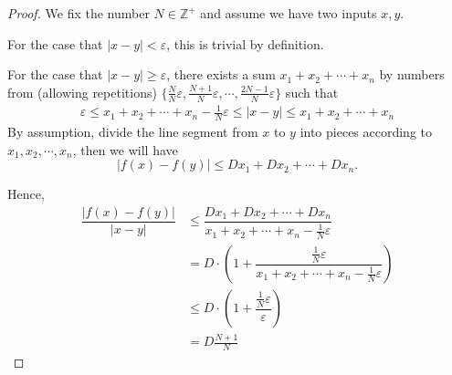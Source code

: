 \documentclass{llncs}
\begin{document}
\begin{proof}
We fix the number $N\in\mathbb{Z}^+$ and assume we have two inputs $x, y$.
	
For the case that $|x-y|<\varepsilon$, this is trivial by definition.

For the case that $|x-y|\geq \varepsilon$, there exists a sum $x_1+x_2+\cdots+x_n$ by numbers from (allowing repetitions) $\{\frac{N}{N}\varepsilon,\frac{N+1}{N}\varepsilon,\cdots, \frac{2N-1}{N}\varepsilon\}$ such that \begin{align*}
	 \varepsilon \leq x_1+x_2+\cdots+x_n -\frac{1}{N}\varepsilon \leq |x-y| \leq x_1+x_2+\cdots+x_n
	\end{align*}
	By assumption, divide the line segment from $x$ to $y$ into pieces according to $x_1, x_2,\cdots,x_n$, then we will have $$|f(x)-f(y)|\leq Dx_1+Dx_2+\cdots+Dx_n.$$
	
	Hence,\begin{align*}
		\dfrac{|f(x)-f(y)|}{|x-y|} &\leq \dfrac{Dx_1+Dx_2+\cdots+Dx_n}{x_1+x_2+\cdots+x_n -\frac{1}{N}\varepsilon}\\
		& = D\cdot( 1+  \dfrac{\frac{1}{N}\varepsilon}{x_1+x_2+\cdots+x_n -\frac{1}{N}\varepsilon})\\
		& \leq D\cdot( 1+  \dfrac{\frac{1}{N}\varepsilon}{\varepsilon})\\
		& = D \frac{N+1}{N} 
	\end{align*}
	
\end{proof}
\end{document}
